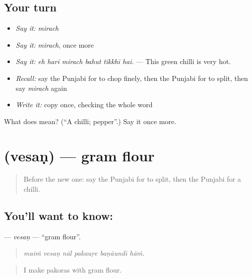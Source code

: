 \subsection*{Your turn}
\begin{itemize}
\raggedright
  \item \emph{Say it:} \emph{mirach}
  \item \emph{Say it:} \emph{mirach}, once more
  \item \emph{Say it:} \emph{eh harī mirach bahut tikkhī hai.} — This green chilli is very hot.
  \item \emph{Recall:} say the Punjabi for to chop finely, then the Punjabi for to split, then say \emph{mirach} again
  \item \emph{Write it:} copy \textbf{} once, checking the whole word
\end{itemize}

\begin{tcolorbox}[breakable,colback=teal!4,colframe=teal!35!black,title={Before you move on}]
What does  mean? (\textquotedblleft{}A chilli; pepper\textquotedblright{}.) Say it once more.
\end{tcolorbox}
\section[\texorpdfstring{\pa{ਵੇਸਣ} (vesaṇ)}{ਵੇਸਣ (vesaṇ)}]{ (vesaṇ) — gram flour}

\label{lesson:PA-C241-vesan}



\begin{quote}
Before the new one: say the Punjabi for to split, then the Punjabi for a chilli.
\end{quote}

\subsection*{You'll want to know: }
\textbf{} — \emph{vesaṇ} — \textquotedblleft{}gram flour\textquotedblright{}.

\begin{quote}
     
\end{quote}

\begin{quote}
\emph{maiṁ vesaṇ nāl pakauṛe baṇāundī hāṁ.}
\end{quote}

\begin{quote}
I make pakoras with gram flour.
\end{quote}

